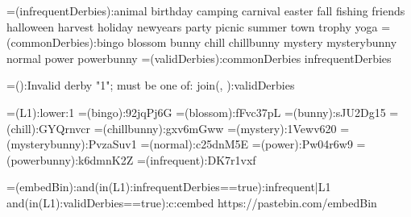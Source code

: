 {=(infrequentDerbies):animal birthday camping carnival easter fall fishing friends halloween harvest holiday newyears party picnic summer town trophy yoga}
{=(commonDerbies):bingo blossom bunny chill chillbunny mystery mysterybunny normal power powerbunny}
{=(validDerbies):{commonDerbies} {infrequentDerbies}}

{=():Invalid derby "{1}"; must be one of: {join(, ):{validDerbies}}}

{=(L1):{lower:{1}}}
{=(bingo):92jqPj6G}
{=(blossom):fFvc37pL}
{=(bunny):sJU2Dg15}
{=(chill):GYQrnvcr}
{=(chillbunny):gxv6mGww}
{=(mystery):1Vewv620}
{=(mysterybunny):PvzaSuv1}
{=(normal):c25dnM5E}
{=(power):Pw04r6w9}
{=(powerbunny):k6dmnK2Z}
{=(infrequent):DK7r1vxf}


{=(embedBin):{{and({in({L1}):{infrequentDerbies}}==true):infrequent|{L1}}}}
{{and({in({L1}):{validDerbies}}==true):c:cembed https://pastebin.com/{embedBin}}}
